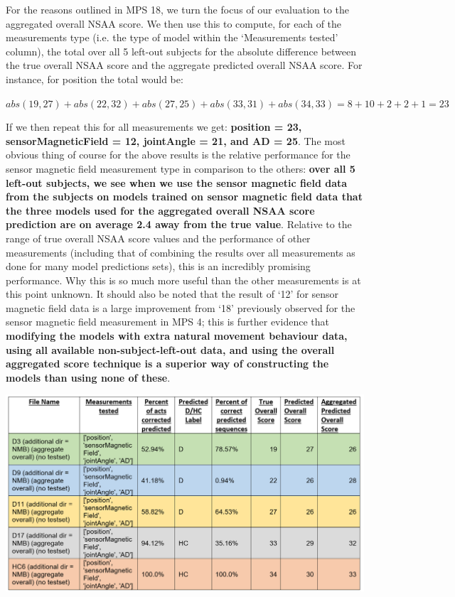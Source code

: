 \documentclass[12pt,twoside]{report}
\begin{document}
\quad For the reasons outlined in MPS 18, we turn the focus of our evaluation to the aggregated overall NSAA score. We then use this to compute, for each of the measurements type (i.e. the type of model within the ‘Measurements tested’ column), the total over all 5 left-out subjects for the absolute difference between the true overall NSAA score and the aggregate predicted overall NSAA score. For instance, for position the total would be:

\begin{center}
$abs(19,27)+abs(22,32)+abs(27,25)+abs(33,31)+abs(34,33)=8+10+2+2+1=23$
\end{center}

\quad If we then repeat this for all measurements we get: \textbf{position = 23, sensorMagneticField = 12, jointAngle = 21, and AD = 25}. The most obvious thing of course for the above results is the relative performance for the sensor magnetic field measurement type in comparison to the others: \textbf{over all 5 left-out subjects, we see when we use the sensor magnetic field data from the subjects on models trained on sensor magnetic field data that the three models used for the aggregated overall NSAA score prediction are on average 2.4 away from the true value}. Relative to the range of true overall NSAA score values and the performance of other measurements (including that of combining the results over all measurements as done for many model predictions sets), this is an incredibly promising performance. Why this is so much more useful than the other measurements is at this point unknown. It should also be noted that the result of ‘12’ for sensor magnetic field data is a large improvement from ‘18’ previously observed for the sensor magnetic field measurement in MPS 4; this is further evidence that \textbf{modifying the models with extra natural movement behaviour data, using all available non-subject-left-out data, and using the overall aggregated score technique is a superior way of constructing the models than using none of these}.

\begin{center}
\includegraphics[scale=0.4]{project_figures/fig11_29}
\end{center}
\end{document}
